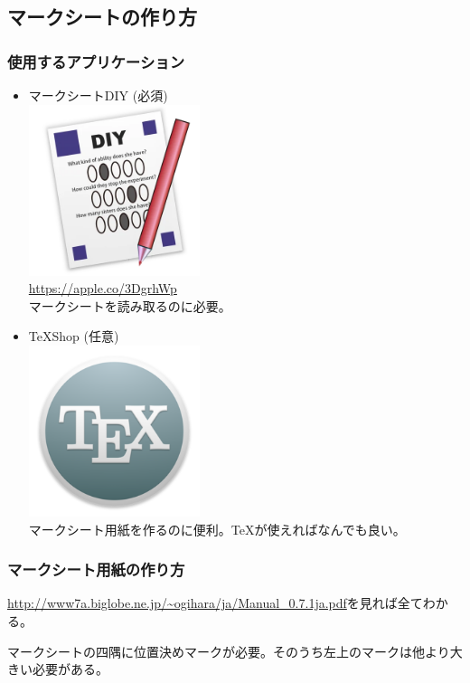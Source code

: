 \documentclass[dvipdfmx,jb5]{jarticle}
\begin{document}
\subsection{マークシートの作り方}
\subsubsection{使用するアプリケーション}
\begin{itemize}
 \item マークシートDIY {\color{red}(必須)}\\
 \includegraphics[width=5cm]{assets/answersheet-diy.png}\\
 \url{https://apple.co/3DgrhWp}\\
 マークシートを読み取るのに必要。
 \item \TeX Shop (任意)\\
 \includegraphics[width=5cm]{assets/TeX.png}\\
 マークシート用紙を作るのに便利。\TeX が使えればなんでも良い。
\end{itemize}
 \subsubsection{マークシート用紙の作り方}
 \url{http://www7a.biglobe.ne.jp/~ogihara/ja/Manual_0.7.1ja.pdf}を見れば全てわかる。

 マークシートの四隅に位置決めマークが必要。そのうち左上のマークは他より大きい必要がある。
\end{document}
